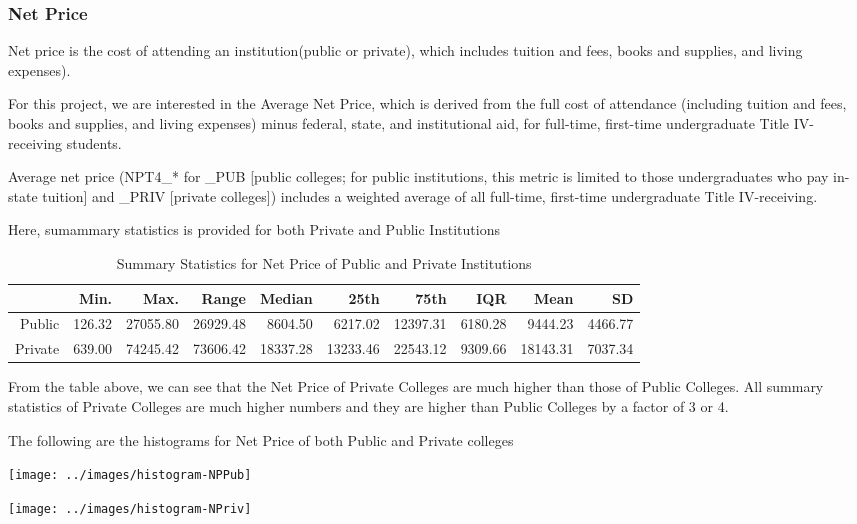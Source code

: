 \documentclass{article}\usepackage[]{graphicx}\usepackage[]{color}
\begin{document}
\subsubsection{Net Price}
Net price is the cost of attending an institution(public or private), which includes tuition and fees, books and supplies, and living expenses).

For this project, we are interested in the Average Net Price,  which is derived from the full cost of attendance (including tuition and fees, books and supplies, and living expenses) minus federal, state, and institutional aid, for full-time, first-time undergraduate Title IV-receiving students. 

Average net price (NPT4_* for _PUB [public colleges; for
public institutions, this metric is limited to those undergraduates who pay in-state tuition] and _PRIV [private colleges]) includes a weighted
average of all full-time, first-time undergraduate Title IV-receiving. 


Here, sumammary statistics is provided for both Private and Public Institutions
\begin{table}[ht]
\centering
\begin{tabular}{rrrrrrrrrr}
  \hline
 & Min. & Max. & Range & Median & 25th & 75th & IQR & Mean & SD \\ 
  \hline
Public & 126.32 & 27055.80 & 26929.48 & 8604.50 & 6217.02 & 12397.31 & 6180.28 & 9444.23 & 4466.77 \\ 
  Private & 639.00 & 74245.42 & 73606.42 & 18337.28 & 13233.46 & 22543.12 & 9309.66 & 18143.31 & 7037.34 \\ 
   \hline
\end{tabular}
\caption{Summary Statistics for Net Price of Public and Private Institutions} 
\end{table}


From the table above, we can see that the Net Price of Private Colleges are much higher than those of Public Colleges. All summary statistics of Private Colleges are much higher numbers and they are higher than Public Colleges by a factor of 3 or 4.

The following are the histograms for Net Price of both Public and Private colleges



{\centering \texttt{[image: ../images/histogram-NPPub]} 

}




{\centering \texttt{[image: ../images/histogram-NPriv]} 

}
\end{document}

